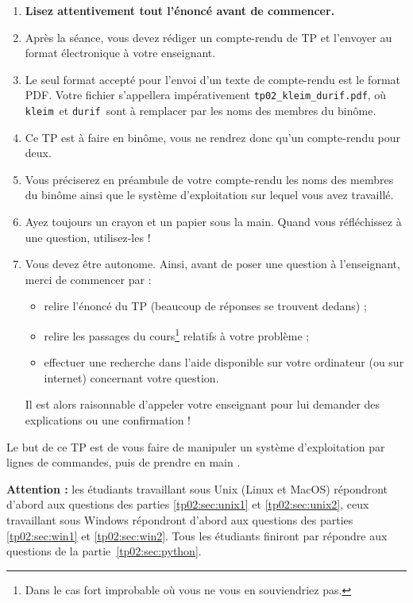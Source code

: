 \begin{enumerate}
\item  \textbf{Lisez attentivement  tout l'énoncé
    avant de commencer.}
\item Après la séance, vous devez rédiger un compte-rendu de TP et
l'envoyer au format électronique à votre enseignant.
\item Le seul format accepté pour l'envoi d'un texte de compte-rendu est le
format PDF. Votre fichier s'appellera impérativement \texttt{tp02\_kleim\_durif.pdf}, où \og \texttt{kleim}\fg\ et \og \texttt{durif}\fg\ sont à remplacer par les noms des membres du binôme. 
\item Ce TP est à faire en binôme, vous ne rendrez donc qu'un compte-rendu pour deux.
\item Vous préciserez en préambule de votre compte-rendu les noms des membres du binôme ainsi que le système d'exploitation sur lequel vous avez travaillé. 
\item Ayez toujours un crayon et un papier sous la main. Quand vous réfléchissez à une question, utilisez-les !
\item Vous devez être autonome. Ainsi, avant de poser une question à l'enseignant, merci de commencer par :
\begin{itemize}
  \item relire l'énoncé du TP (beaucoup de réponses se trouvent dedans) ;
  \item relire les passages du cours\footnote{Dans le cas fort 
improbable où vous ne vous en souviendriez pas.} relatifs à votre problème ;
  \item effectuer une recherche dans l'aide disponible sur votre ordinateur (ou sur internet) concernant votre question.
\end{itemize}
  Il est alors raisonnable d'appeler votre enseignant pour lui demander des explications ou une confirmation !
\end{enumerate}

Le but de ce TP est de vous faire de manipuler un système d'exploitation par lignes de commandes, puis de prendre en main \python{}.

{\bf Attention :} les étudiants travaillant sous Unix (Linux et MacOS) répondront d'abord aux questions des parties \ref{tp02:sec:unix1} et \ref{tp02:sec:unix2}, ceux travaillant sous Windows répondront d'abord aux questions des parties \ref{tp02:sec:win1} et \ref{tp02:sec:win2}. Tous les étudiants finiront par répondre aux questions de la partie~\ref{tp02:sec:python}. 

